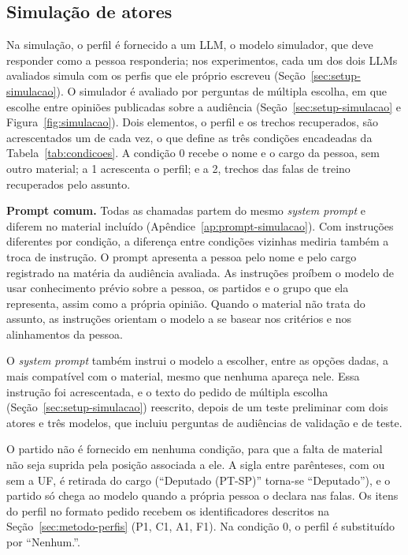 \subsection{Simulação de atores}
\label{sec:metodo-simulacao}

Na simulação, o perfil é fornecido a um LLM, o modelo simulador, que deve responder como a pessoa
responderia; nos experimentos, cada um dos dois LLMs avaliados simula com os perfis que ele próprio
escreveu (Seção~\ref{sec:setup-simulacao}). O simulador é avaliado
por perguntas de múltipla escolha, em que escolhe entre opiniões publicadas sobre a audiência
(Seção~\ref{sec:setup-simulacao} e Figura~\ref{fig:simulacao}). Dois elementos, o perfil e os trechos recuperados, são
acrescentados um de cada vez, o que define as três condições encadeadas da
Tabela~\ref{tab:condicoes}. A condição 0 recebe o nome e o cargo da pessoa, sem outro material; a 1
acrescenta o perfil; e a 2, trechos das falas de treino recuperados pelo assunto.



\textbf{Prompt comum.} Todas as chamadas partem do mesmo \textit{system prompt} e diferem no material
incluído (Apêndice~\ref{ap:prompt-simulacao}). Com instruções diferentes por condição, a diferença
entre condições vizinhas mediria também a troca de instrução. O prompt apresenta a pessoa pelo nome
e pelo cargo registrado na matéria da audiência avaliada. As instruções proíbem o modelo de usar
conhecimento prévio sobre a pessoa, os partidos e o grupo que ela representa, assim como a própria
opinião. Quando o material não trata do assunto, as instruções orientam o modelo a se basear nos
critérios e nos alinhamentos da pessoa.

O \textit{system prompt} também instrui o modelo a escolher, entre as opções dadas, a mais compatível com
o material, mesmo que nenhuma apareça nele. Essa instrução foi acrescentada, e o texto do pedido de
múltipla escolha (Seção~\ref{sec:setup-simulacao}) reescrito, depois de um teste preliminar com dois
atores e três modelos, que incluiu perguntas de audiências de validação e de teste.

O partido não é fornecido em nenhuma condição, para que a falta de material não seja suprida pela
posição associada a ele. A sigla entre parênteses, com ou sem a UF, é retirada do cargo (``Deputado
(PT-SP)'' torna-se ``Deputado''), e o partido só chega ao modelo quando a própria pessoa o declara
nas falas. Os itens do perfil no formato pedido recebem os identificadores descritos na
Seção~\ref{sec:metodo-perfis} (P1, C1, A1, F1). Na condição 0, o perfil é substituído por ``Nenhum.''.

